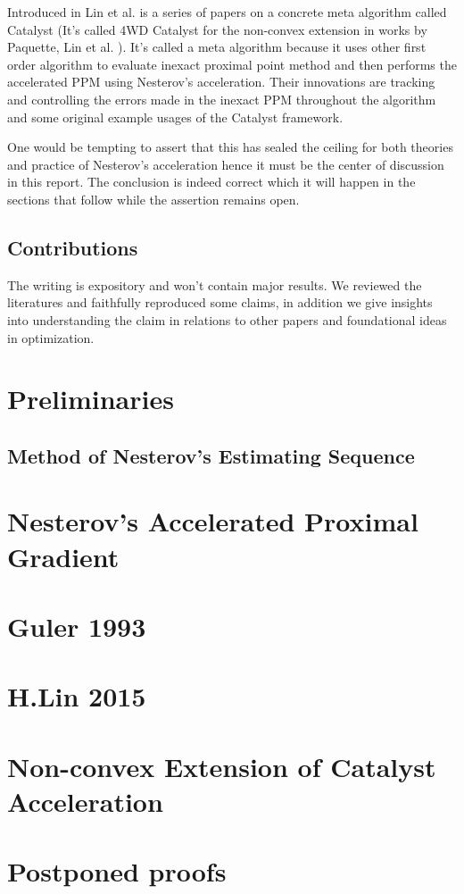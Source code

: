 \documentclass[12pt]{article}
\begin{document}
    Introduced in Lin et al. \cite{lin_universal_2015}\cite{lin_catalyst_2018} is a series of papers on a concrete meta algorithm called Catalyst (It's called 4WD Catalyst for the non-convex extension in works by Paquette, Lin et al. \cite{paquette_catalyst_2018}). 
    It's called a meta algorithm because it uses other first order algorithm to evaluate inexact proximal point method and then performs the accelerated PPM using Nesterov's acceleration. 
    Their innovations are tracking and controlling the errors made in the inexact PPM throughout the algorithm and some original example usages of the Catalyst framework. 

    One would be tempting to assert that this has sealed the ceiling for both theories and practice of Nesterov's acceleration hence it must be the center of discussion in this report. 
    The conclusion is indeed correct which it will happen in the sections that follow while the assertion remains open.  
    
    \subsection{Contributions}
        The writing is expository and won't contain major results. 
        We reviewed the literatures and faithfully reproduced some claims, in addition we give insights into understanding the claim in relations to other papers and foundational ideas in optimization. 

    
\section{Preliminaries}\label{sec:preliminaries}

    \subsection{Method of Nesterov's Estimating Sequence}

\section{Nesterov's Accelerated Proximal Gradient}


\section{Guler 1993}
\section{H.Lin 2015}

\section{Non-convex Extension of Catalyst Acceleration}





\appendix
\section{Postponed proofs}

    
    
\end{document}
